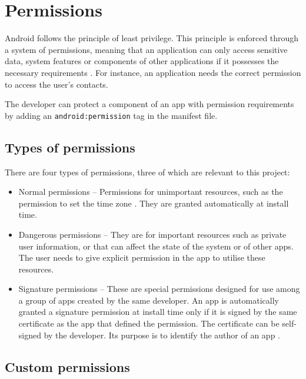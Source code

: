     \section{Permissions}
        \label{sec:permissions}
        
    Android follows the principle of least privilege. This principle is enforced through a system of permissions, meaning that an application can only access sensitive data, system features or components of other applications if it possesses the necessary requirements \cite{permissions_guide}. For instance, an application needs the correct permission to access the user’s contacts.
    
    The developer can protect a component of an app with permission requirements by adding an \lstinline|android:permission| tag in the manifest file.
    
    \subsection{Types of permissions}
        \label{subsec:types_of_permissions}
        
    There are four types of permissions, three of which are relevant to this project:
    
    \begin{itemize}
        \item Normal permissions – Permissions for unimportant resources, such as the permission to set the time zone \cite{permissions_guide}. They are granted automatically at install time.
        \item Dangerous permissions – They are for important resources such as private user information, or that can affect the state of the system or of other apps. The user needs to give explicit permission in the app to utilise these resources.
        \item Signature permissions – These are special permissions designed for use among a group of apps created by the same developer. An app is automatically granted a signature permission at install time only if it is signed by the same certificate as the app that defined the permission. The certificate can be self-signed by the developer. Its purpose is to identify the author of an app \cite{define_custom_permission}.
    \end{itemize}
    
    \subsection{Custom permissions}
        \label{subsec:custom_permissions}
        
